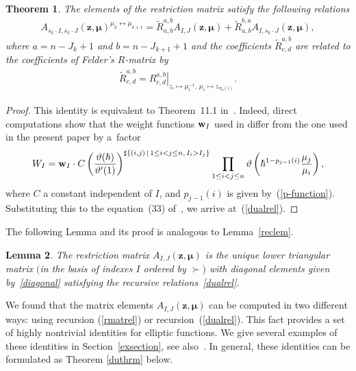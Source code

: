 \documentclass[10pt,a4paper]{amsart}
\def\zz{{\boldsymbol z}}
\def\mub{{\boldsymbol\mu}}
\let\thi\vartheta
\numberwithin{equation}{section}
\newtheorem{Theorem}{Theorem}[section]
\newtheorem{Lemma}[Theorem]{Lemma}
\begin{document}
\begin{Theorem} \label{duthm}The elements of the restriction matrix satisfy the following relations
\begin{gather} \label{dualrel}
A_{s_k \cdot I, s_k \cdot J} (\zz, \mub)^{\mu_k\leftrightarrow \mu_{k+1}}=\tilde{R}^{a,b}_{a,b} A_{I,J}(\zz,\mub) + \tilde{R}^{b,a}_{a,b} A_{I,s_k \cdot J}(\zz,\mub),
\end{gather}
where $a=n-J_k+1$ and $b=n-J_{k+1}+1$ and the coefficients $\tilde{R}^{a,b}_{c,d}$ are related to the coefficients of Felder's $R$-matrix by
\begin{gather} \label{dualR}
\tilde{R}^{a,b}_{c,d}=\left.{R}^{a,b}_{c,d}\right|_{z_i \mapsto \mu_i^{-1} ,\, \mu_i \mapsto z_{\sigma_{0}(i)}}.
\end{gather}
\end{Theorem}
\begin{proof}This identity is equivalent to Theorem~11.1 in~\cite{RW}. Indeed, direct computations show that the weight functions
${\bf w}_{I}$ used in \cite{RW} differ from the one used in the present paper by a~factor
\begin{gather*}
W_I = {\bf w}_{I} \cdot C \left( \dfrac{\thi (\hbar)}{\thi' (1)} \right)^{\sharp \{ (i,j) \,|\, 1\leq i<j\leq n, \, I_i > I_j \} } \prod_{1\leq i<j\leq n} \thi \left( \hbar^{1- p_{j-1} (i)} \dfrac{\mu_j}{\mu_i} \right) ,
\end{gather*}
where $C$ a constant independent of $I$, and $p_{j-1} (i)$ is given by~(\ref{p-function}). Substituting this to the equation~(33) of~\cite{RW}, we arrive at~(\ref{dualrel}).
\end{proof}

The following Lemma and its proof is analogous to Lemma~\ref{reclem}.
\begin{Lemma} \label{dulem} The restriction matrix $A_{I,J}(\zz,\mub)$ is the unique lower triangular matrix $($in the basis of indexes $I$ ordered by $\succ)$ with diagonal elements given by~\eqref{diagonal} satisfying the recursive relations~\eqref{dualrel}.
\end{Lemma}

\begin{Note} We found that the matrix elements $A_{I,J}(\zz,\mub)$ can be computed in two different ways: using recursion (\ref{rmatrel}) or recursion~(\ref{dualrel}). This fact provides a set of highly nontrivial identities for elliptic functions. We give several examples of these identities in Section~\ref{exsection}, see also~\cite[Section 9]{RW}. In general, these identities can be formulated as Theorem \ref{duthrm} below.
\end{Note}
\end{document}
